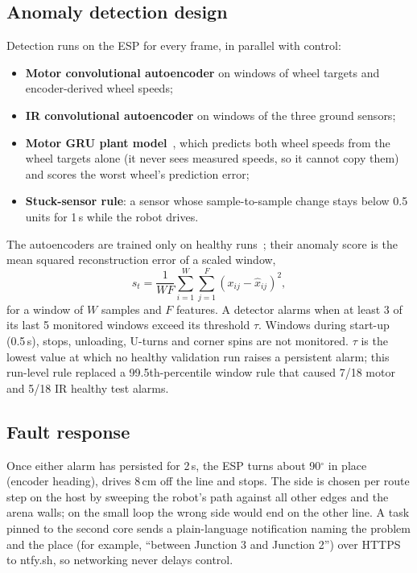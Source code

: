 \documentclass[conference]{IEEEtran}
\begin{document}
\subsection{Anomaly detection design}
Detection runs on the ESP for every frame, in parallel with control:
\begin{itemize}
\item \textbf{Motor convolutional autoencoder} on windows of wheel targets and
  encoder-derived wheel speeds;
\item \textbf{IR convolutional autoencoder} on windows of the three ground sensors;
\item \textbf{Motor GRU plant model}~\cite{gru}, which predicts both wheel speeds
  from the wheel targets alone (it never sees measured speeds, so it cannot copy
  them) and scores the worst wheel's prediction error;
\item \textbf{Stuck-sensor rule}: a sensor whose sample-to-sample change stays
  below 0.5 units for 1\,s while the robot drives.
\end{itemize}
The autoencoders are trained only on healthy runs~\cite{sakurada2014}; their
anomaly score is the mean squared reconstruction error of a scaled window,
\begin{equation}
s_t=\frac{1}{WF}\sum_{i=1}^{W}\sum_{j=1}^{F}\left(x_{ij}-\hat{x}_{ij}\right)^2 ,
\end{equation}
for a window of $W$ samples and $F$ features. A detector alarms when at least
3 of its last 5 monitored windows exceed its threshold $\tau$. Windows during
start-up (0.5\,s), stops, unloading, U-turns and corner spins are not monitored.
$\tau$ is the lowest value at which no healthy validation run raises a
persistent alarm; this run-level rule replaced a 99.5th-percentile window rule
that caused 7/18 motor and 5/18 IR healthy test alarms.

\subsection{Fault response}
Once either alarm has persisted for 2\,s, the ESP turns about 90$^\circ$ in place
(encoder heading), drives 8\,cm off the line and stops. The side is chosen per
route step on the host by sweeping the robot's path against all other edges and
the arena walls; on the small loop the wrong side would end on the other line. A
task pinned to the second core sends a plain-language notification naming the
problem and the place (for example, ``between Junction 3 and Junction 2'') over
HTTPS to ntfy.sh, so networking never delays control.
\end{document}
